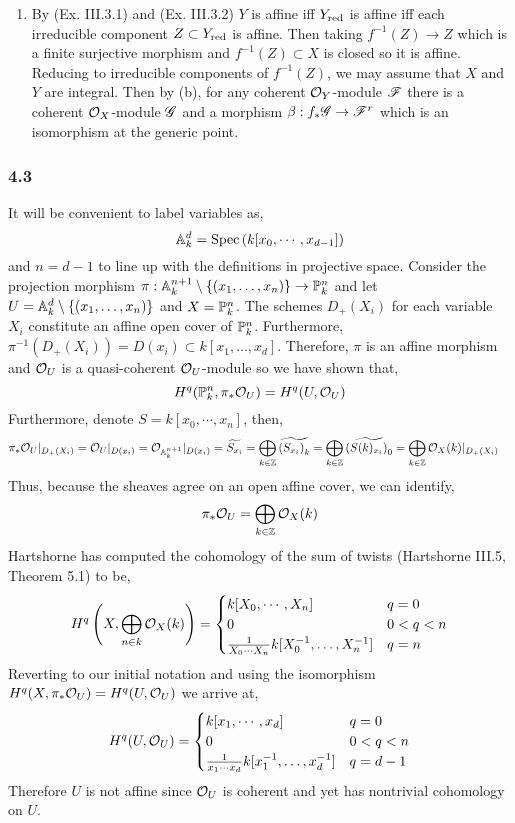 \documentclass[12pt]{article}
\begin{document}
\begin{enumerate}
\item By (Ex. III.3.1) and (Ex. III.3.2) $Y$ is affine iff $Y_\red$ is affine iff each irreducible component $Z \subset Y_\red$ is affine. Then taking $f^{-1}(Z) \to Z$ which is a finite surjective morphism and $f^{-1}(Z) \subset X$ is closed so it is affine. Reducing to irreducible components of $f^{-1}(Z)$, we may assume that $X$ and $Y$ are integral. Then by (b), for any coherent $\struct{Y}$-module $\F$ there is a coherent $\struct{X}$-module $\G$ and a morphism $\beta : f_* \G \to \F^{r}$ which is an isomorphism at the generic point. 

\end{enumerate}

\subsubsection{4.3}


It will be convenient to label variables as,
\[ \A^d_k = \Spec{k[x_0, \cdots, x_{d-1}]} \]
and $n = d-1$ to line up with the definitions in projective space. Consider the projection morphism $\pi : \A^{n+1}_k \setminus \{ (x_1, \dots, x_n) \} \to \P^{n}_k$ and let $U = \A^d_k \setminus \{ (x_1, \dots, x_n) \}$ and $X = \P^n_k$. The schemes $D_{+}(X_i)$ for each variable $X_i$ constitute an affine open cover of $\P^{n}_k$. Furthermore, $\pi^{-1}(D_{+}(X_i)) = D(x_{i}) \subset k[x_1, \dots, x_d]$. Therefore, $\pi$ is an affine morphism and $\struct{U}$ is a quasi-coherent $\struct{U}$-module so we have shown that,
\[ H^q(\P^{n}_k, \pi_* \struct{U}) = H^q(U, \struct{U}) \] 
Furthermore, denote $S = k[x_0, \cdots, x_n]$, then,
\begin{align*}
\pi_* \struct{U} |_{D_{+}(X_i)} & = \struct{U} |_{D(x_{i})} = \struct{\A^{n+1}_k} |_{D(x_{i})} = \widetilde{S_{x_{i}}}  = \bigoplus_{k \in \Z} \widetilde{\left( S_{x_i} \right)_k} = \bigoplus_{k \in \Z} \widetilde{\left( S(k)_{x_i} \right)_{0}} = \bigoplus_{k \in \Z} \struct{X}(k)|_{D_+(X_i)}
\end{align*}
Thus, because the sheaves agree on an open affine cover, we can identify,
\[ \pi_* \struct{U} = \bigoplus_{k \in \Z} \struct{X}(k) \]
Hartshorne has computed the cohomology of the sum of twists (Hartshorne III.5, Theorem 5.1) to be,
\[  H^q \left(X, \bigoplus_{n \in k} \struct{X}(k) \right) = 
\begin{cases}
k[X_0, \cdots, X_n] & q = 0
\\
0 & 0 < q < n
\\
\frac{1}{X_0 \cdots X_n} k[X_0^{-1}, \dots, X_n^{-1}] & q = n 
\end{cases} \]
Reverting to our initial notation and using the isomorphism $H^q(X, \pi_* \struct{U}) = H^q(U, \struct{U})$ we arrive at,
\[ H^q(U, \struct{U}) = 
\begin{cases}
k[x_1, \cdots, x_d] & q = 0
\\
0 & 0 < q < n
\\
\frac{1}{x_1 \cdots x_d} k[x_1^{-1}, \dots, x_d^{-1}] & q = d-1 
\end{cases} \]
Therefore $U$ is not affine since $\struct{U}$ is coherent and yet has nontrivial cohomology on $U$.
\end{document}
